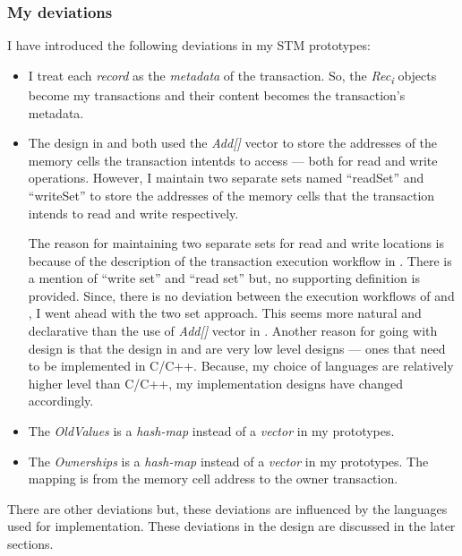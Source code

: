 \documentclass[../main]{subfiles}
\begin{document}
  \subsubsection{My deviations}
  
  \par
  I have introduced the following deviations in my STM prototypes: \par
  \begin{itemize}
    \item I treat each {\em record} as the {\em metadata} of the transaction. So, the {\em Rec\textsubscript{i}} objects become my transactions and their content becomes the transaction's metadata.

    \item The design in \cite{Shavit1997} and \cite{weimerskirch2008software} both used the {\em Add[]} vector to store the addresses of the memory cells the transaction intentds to access --- both for read and write operations. However, I maintain two separate sets named ``readSet'' and ``writeSet'' to store the addresses of the memory cells that the transaction intends to read and write respectively. \par

    The reason for maintaining two separate sets for read and write locations is because of the description of the transaction execution workflow in \cite{weimerskirch2008software}. There is a mention of ``write set'' and ``read set'' but, no supporting definition is provided. Since, there is no deviation between the execution workflows of \cite{Shavit1997} and \cite{weimerskirch2008software}, I went ahead with the two set approach. This seems more natural and declarative than the use of {\em Add[]} vector in \cite{Shavit1997}. Another reason for going with design is that the design in \cite{Shavit1997} and \cite{weimerskirch2008software} are very low level designs --- ones that need to be implemented in C/C++. Because, my choice of languages are relatively higher level than C/C++, my implementation designs have changed accordingly. \par

    \item The {\em OldValues} is a {\em hash-map} instead of a {\em vector} in my prototypes.

    \item The {\em Ownerships} is a {\em hash-map} instead of a {\em vector} in my prototypes. The mapping is from the memory cell address to the owner transaction.
  \end{itemize}

  \par
  There are other deviations but, these deviations are influenced by the languages used for implementation. These deviations in the design are discussed in the later sections. \par
\end{document}
